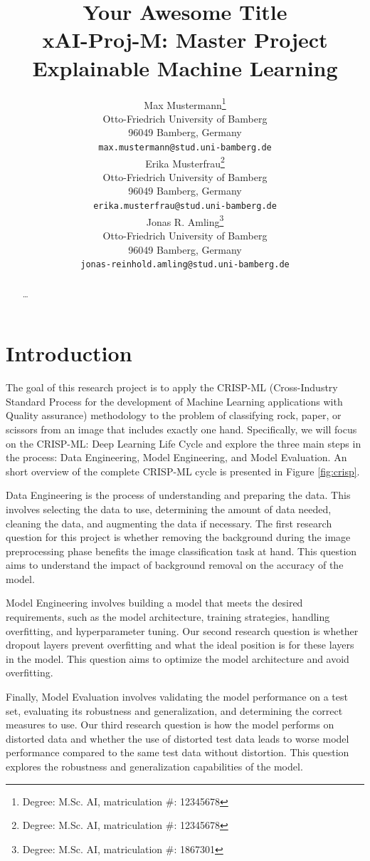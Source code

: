 \documentclass[a4paper]{article}
\title{ Your Awesome Title\\ {\large xAI-Proj-M: Master Project Explainable Machine Learning }}
\author{%
  Max Mustermann\thanks{Degree: M.Sc. AI, matriculation \#: 12345678} \\
  Otto-Friedrich University of Bamberg\\
  96049 Bamberg, Germany\\
  \texttt{max.mustermann@stud.uni-bamberg.de}\\
   \And
   Erika Musterfrau\thanks{Degree: M.Sc. AI, matriculation \#: 12345678}\\
   Otto-Friedrich University of Bamberg\\
   96049 Bamberg, Germany\\
   \texttt{erika.musterfrau@stud.uni-bamberg.de} \\
   \And
   Jonas R. Amling\thanks{Degree: M.Sc. AI, matriculation \#: 1867301}\\
   Otto-Friedrich University of Bamberg\\
   96049 Bamberg, Germany\\
   \texttt{jonas-reinhold.amling@stud.uni-bamberg.de} \\
}
\begin{document}
\maketitle
\def\va{{\bm{a}}}

\begin{abstract}
  \dots
\end{abstract}


\section{Introduction}

The goal of this research project is to apply the CRISP-ML (Cross-Industry Standard Process for the development of Machine Learning applications with Quality assurance) methodology \citep{crisp} to the problem of classifying rock, paper, or scissors from an image that includes exactly one hand. Specifically, we will focus on the CRISP-ML: Deep Learning Life Cycle and explore the three main steps in the process: Data Engineering, Model Engineering, and Model Evaluation. An short overview of the complete CRISP-ML cycle is presented in Figure \ref{fig:crisp}.

Data Engineering is the process of understanding and preparing the data. This involves selecting the data to use, determining the amount of data needed, cleaning the data, and augmenting the data if necessary. The first research question for this project is whether removing the background during the image preprocessing phase benefits the image classification task at hand. This question aims to understand the impact of background removal on the accuracy of the model.

Model Engineering involves building a model that meets the desired requirements, such as the model architecture, training strategies, handling overfitting, and hyperparameter tuning. Our second research question is whether dropout layers prevent overfitting and what the ideal position is for these layers in the model. This question aims to optimize the model architecture and avoid overfitting.

Finally, Model Evaluation involves validating the model performance on a test set, evaluating its robustness and generalization, and determining the correct measures to use. Our third research question is how the model performs on distorted data and whether the use of distorted test data leads to worse model performance compared to the same test data without distortion. This question explores the robustness and generalization capabilities of the model.
\end{document}
